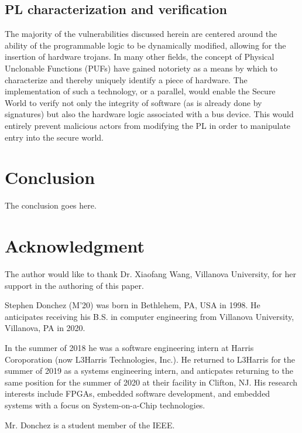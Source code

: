 \documentclass[journal]{IEEEtran}
\begin{document}
\subsection{PL characterization and verification}
The majority of the vulnerabilities discussed herein are centered around the ability of
the programmable logic to be dynamically modified, allowing for the insertion of hardware
trojans. In many other fields, the concept of Physical Unclonable Functions (PUFs) have
gained notoriety as a means by which to characterize and thereby uniquely identify a piece
of hardware. The implementation of such a technology, or a parallel, would enable
the Secure World to verify not only the integrity of software (as is already done by
signatures) but also the hardware logic associated with a bus device. This would entirely
prevent malicious actors from modifying the PL in order to manipulate entry into the
secure world.

\section{Conclusion}
The conclusion goes here.

\section*{Acknowledgment}
The author would like to thank Dr. Xiaofang Wang, Villanova University, for her support in
the authoring of this paper.




\begin{IEEEbiography}
	{Stephen Donchez}
(M'20) was born in Bethlehem, PA, USA in 1998. He anticipates receiving his B.S. in
computer engineering from Villanova University, Villanova, PA in 2020.

In the summer of 2018 he was a software engineering intern at Harris Coroporation 
(now L3Harris Technologies, Inc.). He returned to L3Harris for the summer of 2019 as a 
systems engineering intern, and anticpates returning to the same position for the summer
of 2020 at their facility in Clifton, NJ. His research interests include FPGAs, embedded
software development, and embedded systems with a focus on System-on-a-Chip technologies.

Mr. Donchez is a student member of the IEEE.
\end{IEEEbiography}
\end{document}
